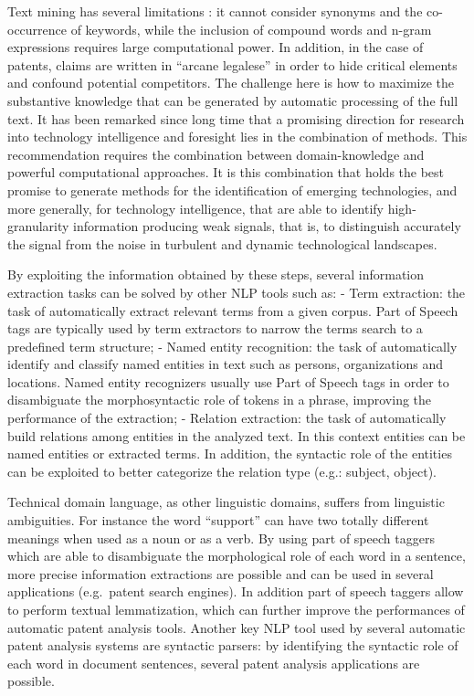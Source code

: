 \documentclass[]{book}
\begin{document}
Text mining has several limitations : it cannot consider synonyms and
the co-occurrence of keywords, while the inclusion of compound words and
n-gram expressions requires large computational power. In addition, in
the case of patents, claims are written in ``arcane legalese'' in order
to hide critical elements and confound potential competitors. The
challenge here is how to maximize the substantive knowledge that can be
generated by automatic processing of the full text. It has been remarked
since long time that a promising direction for research into technology
intelligence and foresight lies in the combination of methods. This
recommendation requires the combination between domain-knowledge and
powerful computational approaches. It is this combination that holds the
best promise to generate methods for the identification of emerging
technologies, and more generally, for technology intelligence, that are
able to identify high-granularity information producing weak signals,
that is, to distinguish accurately the signal from the noise in
turbulent and dynamic technological landscapes.

By exploiting the information obtained by these steps, several
information extraction tasks can be solved by other NLP tools such as: -
Term extraction: the task of automatically extract relevant terms from a
given corpus. Part of Speech tags are typically used by term extractors
to narrow the terms search to a predefined term structure; - Named
entity recognition: the task of automatically identify and classify
named entities in text such as persons, organizations and locations.
Named entity recognizers usually use Part of Speech tags in order to
disambiguate the morphosyntactic role of tokens in a phrase, improving
the performance of the extraction; - Relation extraction: the task of
automatically build relations among entities in the analyzed text. In
this context entities can be named entities or extracted terms. In
addition, the syntactic role of the entities can be exploited to better
categorize the relation type (e.g.: subject, object).

Technical domain language, as other linguistic domains, suffers from
linguistic ambiguities. For instance the word ``support'' can have two
totally different meanings when used as a noun or as a verb. By using
part of speech taggers which are able to disambiguate the morphological
role of each word in a sentence, more precise information extractions
are possible and can be used in several applications (e.g.~patent search
engines). In addition part of speech taggers allow to perform textual
lemmatization, which can further improve the performances of automatic
patent analysis tools. Another key NLP tool used by several automatic
patent analysis systems are syntactic parsers: by identifying the
syntactic role of each word in document sentences, several patent
analysis applications are possible.
\end{document}
